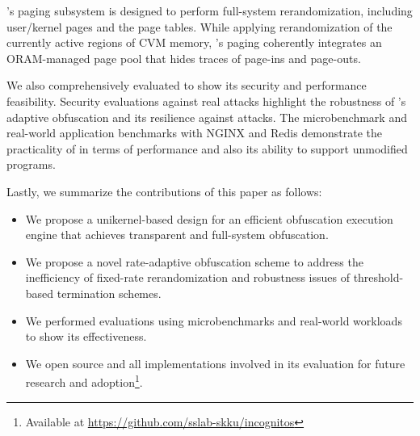 \thename's paging subsystem is designed to perform full-system rerandomization, including user/kernel pages and the page tables.
While applying rerandomization of the currently active regions of CVM memory, \thename's paging coherently integrates an ORAM-managed page pool that hides traces of page-ins and page-outs.

We also comprehensively evaluated \thename to show its security and performance feasibility.
Security evaluations against real attacks highlight the robustness of \thename's adaptive obfuscation and its resilience against attacks.
The microbenchmark and real-world application benchmarks with NGINX and Redis demonstrate the practicality of \thename in terms of performance and also its ability to support unmodified programs.



\vspace{0.2em}

Lastly, we summarize the contributions of this paper as follows:

\vspace{0.2em}

\begin{itemize}
	\setlength\itemsep{0.3em}
	\item[-] We propose a unikernel-based design for an efficient obfuscation execution engine that achieves transparent and full-system obfuscation.

	\item[-] We propose a novel rate-adaptive obfuscation scheme to address the inefficiency of fixed-rate rerandomization and robustness issues of threshold-based termination schemes.
	\item[-] We performed evaluations using microbenchmarks and real-world workloads to show its effectiveness.
	\item[-] We open source \thename and all implementations involved in its evaluation for future research and adoption\footnote{Available at \url{https://github.com/sslab-skku/incognitos}}.
\end{itemize}




